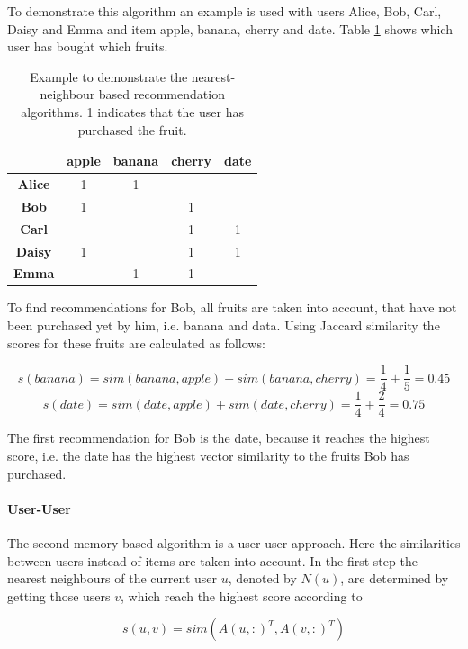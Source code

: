 \documentclass[10pt]{reportMaster}
\begin{document}
To demonstrate this algorithm an example is used with users Alice, Bob, Carl, Daisy and Emma and item apple, banana, cherry and date.
Table \ref{tab:example} shows which user has bought which fruits.
\begin{table}[h!]
	\begin{tabular}{|c|c|c|c|c|}
		\hline
		&\textbf{apple}&\textbf{banana}&\textbf{cherry}&\textbf{date}\\ \hline
		\textbf{Alice}&1&1&&\\ \hline
		\textbf{Bob}&1&&1&\\ \hline	
		\textbf{Carl}&&&1&1\\ \hline	
		\textbf{Daisy}&1&&1&1\\ \hline	
		\textbf{Emma}&&1&1&\\ \hline	
	\end{tabular}
	\caption[Example for nearest-neighbour based algorithms]{Example to demonstrate the nearest-neighbour based recommendation algorithms. 1 indicates that the user has purchased the fruit.}	
	\label{tab:example}
\end{table}

To find recommendations for Bob, all fruits are taken into account, that have not been purchased yet by him, i.e. banana and data.
Using Jaccard similarity the scores for these fruits are calculated as follows:

$$s(banana) = sim(banana, apple) + sim(banana, cherry) = \frac{1}{4} + \frac{1}{5} = 0.45$$
$$s(date) = sim(date, apple) + sim(date, cherry) = \frac{1}{4} + \frac{2}{4} = 0.75$$

The first recommendation for Bob is the date, because it reaches the highest score, i.e. the date has the highest vector similarity to the fruits Bob has purchased.


\paragraph{User-User}
The second memory-based algorithm is a user-user approach. %
Here the similarities between users instead of items are taken into account.
In the first step the nearest neighbours of the current user $u$, denoted by $N(u)$, are determined by getting those users $v$, which reach the highest score according to

\begin{equation}
	s(u,v) = sim(A(u,:)^T, A(v, :)^T)
\end{equation}
\end{document}
